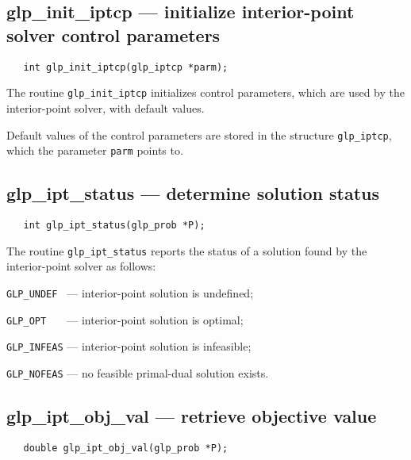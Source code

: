 \newpage

\subsection{glp\_init\_iptcp --- initialize interior-point solver
control parameters}

\synopsis

\begin{verbatim}
   int glp_init_iptcp(glp_iptcp *parm);
\end{verbatim}

\description

The routine \verb|glp_init_iptcp| initializes control parameters, which
are used by the interior-point solver, with default values.

Default values of the control parameters are stored in the structure
\verb|glp_iptcp|, which the parameter \verb|parm| points to.

\subsection{glp\_ipt\_status --- determine solution status}

\synopsis

\begin{verbatim}
   int glp_ipt_status(glp_prob *P);
\end{verbatim}

\returns

The routine \verb|glp_ipt_status| reports the status of a solution
found by the interior-point solver as follows:

\verb|GLP_UNDEF | --- interior-point solution is undefined;

\verb|GLP_OPT   | --- interior-point solution is optimal;

\verb|GLP_INFEAS| --- interior-point solution is infeasible;

\verb|GLP_NOFEAS| --- no feasible primal-dual solution exists.

\subsection{glp\_ipt\_obj\_val --- retrieve objective value}

\synopsis

\begin{verbatim}
   double glp_ipt_obj_val(glp_prob *P);
\end{verbatim}

\returns

